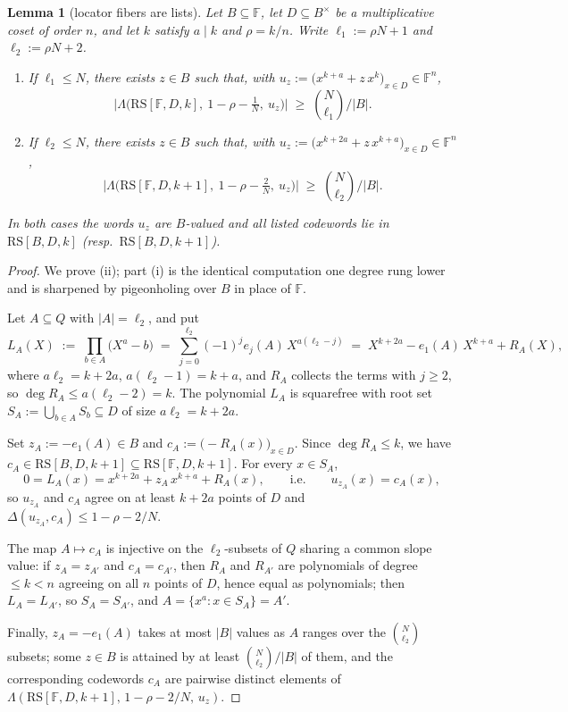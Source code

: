 \documentclass[11pt]{article}
\newtheorem{lemma}[lemma]{Lemma}
\theoremstyle{definition}
\theoremstyle{remark}
\newcommand{\F}{\mathbb{F}}
\newcommand{\B}{B}
\newcommand{\RS}{\mathrm{RS}}
\newcommand{\dist}{\Delta}
\newcommand{\Lst}{\Lambda}
\begin{document}
\begin{lemma}[locator fibers are lists]\label{lem:fiber}
Let $\B\subseteq\F$, let $D\subseteq\B^\times$ be a multiplicative coset of order $n$, and let $k$ satisfy $a\mid k$ and $\rho=k/n$. Write $\ell_1:=\rho N+1$ and $\ell_2:=\rho N+2$.
\begin{enumerate}[label=\textup{(\roman*)}]
\item If $\ell_1\le N$, there exists $z\in\B$ such that, with $u_z:=\bigl(x^{k+a}+z\,x^{k}\bigr)_{x\in D}\in\F^n$,
\[
\bigl|\Lst\bigl(\RS[\F,D,k],\ 1-\rho-\tfrac1N,\ u_z\bigr)\bigr|\;\ge\;\binom{N}{\ell_1}\Big/|\B| .
\]
\item If $\ell_2\le N$, there exists $z\in\B$ such that, with $u_z:=\bigl(x^{k+2a}+z\,x^{k+a}\bigr)_{x\in D}\in\F^n$,
\[
\bigl|\Lst\bigl(\RS[\F,D,k+1],\ 1-\rho-\tfrac2N,\ u_z\bigr)\bigr|\;\ge\;\binom{N}{\ell_2}\Big/|\B| .
\]
\end{enumerate}
In both cases the words $u_z$ are $\B$-valued and all listed codewords lie in $\RS[\B,D,k]$ \textup(resp.\ $\RS[\B,D,k+1]$\textup).
\end{lemma}

\begin{proof}
We prove (ii); part (i) is the identical computation one degree rung lower and is \cite[Main Thm.\,(d)]{Cho26a} sharpened by pigeonholing over $\B$ in place of $\F$.

Let $A\subseteq Q$ with $|A|=\ell_2$, and put
\[
L_A(X)\;:=\;\prod_{b\in A}\bigl(X^a-b\bigr)\;=\;\sum_{j=0}^{\ell_2}(-1)^j e_j(A)\,X^{a(\ell_2-j)}\;=\;X^{k+2a}-e_1(A)\,X^{k+a}+R_A(X),
\]
where $a\ell_2=k+2a$, $a(\ell_2-1)=k+a$, and $R_A$ collects the terms with $j\ge2$, so $\deg R_A\le a(\ell_2-2)=k$. The polynomial $L_A$ is squarefree with root set $S_A:=\bigcup_{b\in A}S_b\subseteq D$ of size $a\ell_2=k+2a$.

Set $z_A:=-e_1(A)\in\B$ and $c_A:=\bigl(-R_A(x)\bigr)_{x\in D}$. Since $\deg R_A\le k$, we have $c_A\in\RS[\B,D,k+1]\subseteq\RS[\F,D,k+1]$. For every $x\in S_A$,
\[
0=L_A(x)=x^{k+2a}+z_A\,x^{k+a}+R_A(x),\qquad\text{i.e.}\qquad u_{z_A}(x)=c_A(x),
\]
so $u_{z_A}$ and $c_A$ agree on at least $k+2a$ points of $D$ and $\dist(u_{z_A},c_A)\le1-\rho-2/N$.

The map $A\mapsto c_A$ is injective on the $\ell_2$-subsets of $Q$ sharing a common slope value: if $z_A=z_{A'}$ and $c_A=c_{A'}$, then $R_A$ and $R_{A'}$ are polynomials of degree $\le k<n$ agreeing on all $n$ points of $D$, hence equal as polynomials; then $L_A=L_{A'}$, so $S_A=S_{A'}$, and $A=\{x^a:x\in S_A\}=A'$.

Finally, $z_A=-e_1(A)$ takes at most $|\B|$ values as $A$ ranges over the $\binom{N}{\ell_2}$ subsets; some $z\in\B$ is attained by at least $\binom{N}{\ell_2}/|\B|$ of them, and the corresponding codewords $c_A$ are pairwise distinct elements of $\Lst(\RS[\F,D,k+1],\,1-\rho-2/N,\,u_z)$.
\end{proof}
\end{document}
